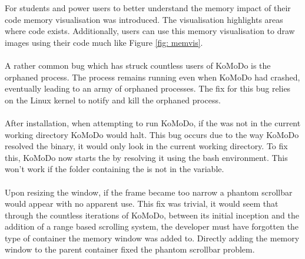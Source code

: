   For students and power users to better understand the memory impact of their code memory visualisation was introduced. The visualisation highlights areas where code exists. Additionally, users can use this memory visualisation to draw images using their code much like Figure \ref{fig: memvis}.\\\\
  A rather common bug which has struck countless users of KoMoDo is the orphaned  process. The process remains running even when KoMoDo had crashed, eventually leading to an army of orphaned processes. The fix for this bug relies on the Linux kernel to notify and kill the orphaned process.\\\\
  After installation, when attempting to run KoMoDo, if the  was not in the current working directory KoMoDo would halt. This bug occurs due to the way KoMoDo resolved the  binary, it would only look in the current working directory. To fix this, KoMoDo now starts the  by resolving it using the bash environment. This won't work if the folder containing the  is not in the  variable.\\\\
  Upon resizing the window, if the frame became too narrow a phantom scrollbar would appear with no apparent use. This fix was trivial, it would seem that through the countless iterations of KoMoDo, between its initial inception and the addition of a range based scrolling system, the developer must have forgotten the type of container the memory window was added to. Directly adding the memory window to the parent container fixed the phantom scrollbar problem.\\\\
